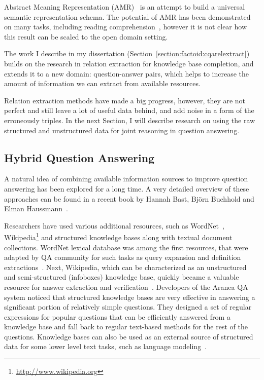 Abstract Meaning Representation (AMR)~\cite{banarescu2013abstract} is an attempt to build a universal semantic representation schema.
The potential of AMR has been demonstrated on many tasks, including reading comprehension~\cite{wang2016reading}, however it is not clear how this result can be scaled to the open domain setting.

The work I describe in my dissertation (Section~\ref{section:factoid:cqarelextract}) builds on the research in relation extraction for knowledge base completion, and extends it to a new domain: question-answer pairs, which helps to increase the amount of information we can extract from available resources.

Relation extraction methods have made a big progress, however, they are not perfect and still leave a lot of useful data behind, and add noise in a form of the erroneously triples.
In the next Section, I will describe research on using the raw structured and unstructured data for joint reasoning in question answering.

\subsection{Hybrid Question Answering}
\label{section:relatedwork:factoid:hybrid}

A natural idea of combining available information sources to improve question answering has been explored for a long time.
A very detailed overview of these approaches can be found in a recent book by Hannah Bast, Bj\"orn Buchhold and Elman Haussmann~\cite{bast2016semantic}.

Researchers have used various additional resources, such as WordNet~\cite{miller1995wordnet}, Wikipedia\footnote{\href{url}{http://www.wikipedia.org}} and structured knowledge bases along with textual document collections.
WordNet lexical database was among the first resources, that were adapted by QA community for such tasks as query expansion and definition extractions~\cite{hovy2001use,pasca2001informative}.
Next, Wikipedia, which can be characterized as an unstructured and semi-structured (infoboxes) knowledge base, quickly became a valuable resource for answer extraction and verification~\cite{ahn2005using,buscaldi2006mining}.
Developers of the Aranea QA~\cite{lin2003question} system noticed that structured knowledge bases are very effective in answering a significant portion of relatively simple questions.
They designed a set of regular expressions for popular questions that can be efficiently answered from a knowledge base and fall back to regular text-based methods for the rest of the questions.
Knowledge bases can also be used as an external source of structured data for some lower level text tasks, such as language modeling~\cite{ahn2016neural}.

